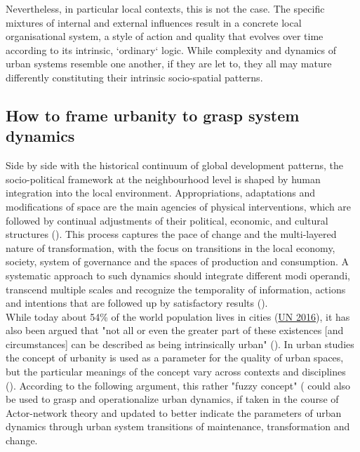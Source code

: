 \documentclass[11pt]{report}
\begin{document}
{{{Nevertheless, in particular local contexts, this is not the case. The specific mixtures of internal and external influences result in a concrete local organisational system, a style of action and quality that evolves over time according to its intrinsic, ‘ordinary‘ logic. While complexity and dynamics of urban systems resemble one another, if they are let to, they all may mature differently constituting their intrinsic socio-spatial patterns.

\subsection{How to frame urbanity to grasp system dynamics}

Side by side with the historical continuum of global development patterns, the socio-political framework at the neighbourhood level is shaped by human integration into the local environment.
Appropriations, adaptations and modifications of space are the main agencies of physical interventions, which are followed by continual adjustments of their political, economic, and cultural structures (\href{Sykola}{\citealt{sykora_transitional_1999}}).
This process captures the pace of change and the multi-layered nature of transformation, with the focus on transitions in the local economy, society, system of governance and the spaces of production and consumption. A systematic approach to such dynamics should integrate different modi operandi, transcend multiple scales and recognize the temporality of information, actions and intentions that are followed up by satisfactory results  (\href{Tardin}{\citealt{tardin_landscape_2014}}).
\\

While today about 54\% of the world population lives in cities (\href{UN}{UN 2016}), it has also been argued that "not all or even the greater part of these existences [and circumstances] can be described as being intrinsically urban"
(\href{Scott}{\citealt{scott_nature_2015}}).
In urban studies the concept of urbanity is used as a parameter for the quality of urban spaces, but the particular meanings of the concept vary across contexts and disciplines (\citealt{(Bisson 2016}).
According to the following argument, this rather "fuzzy concept" (\citealt{Bourdin 2010} could also be used to grasp and operationalize urban dynamics, if taken in the course of Actor-network theory and updated to better indicate the parameters of urban dynamics through urban system transitions of maintenance, transformation and change.
\\

}}}
\end{document}
